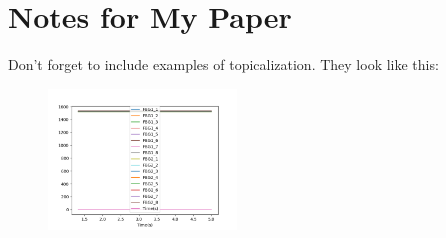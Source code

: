 \documentclass[12pt]{article}
\begin{document}
\section*{Notes for My Paper}

Don't forget to include examples of topicalization.
They look like this:
\begin{figure}
	\centering
	\includegraphics[width=5cm]{Figure_1.png}
\end{figure}
\end{document}

